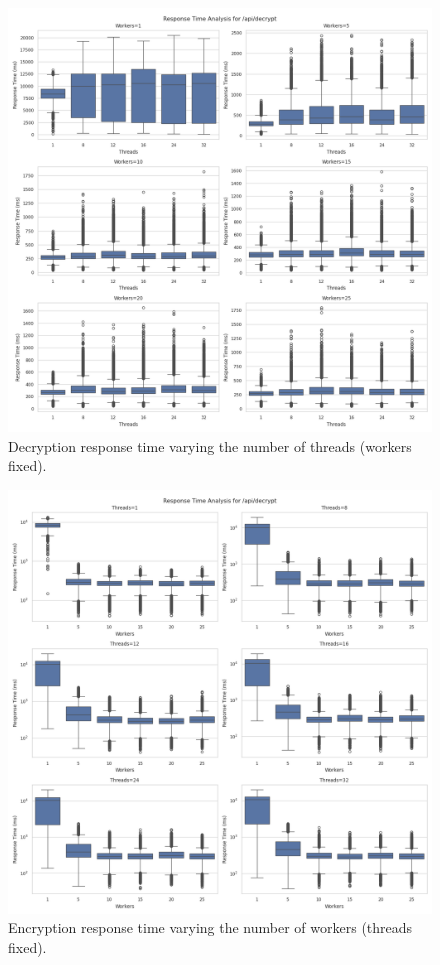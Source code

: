 \documentclass[cic,tc,english]{iiufrgs}
\numberwithin{algorithm}{chapter}
\begin{document}
        \begin{figure}
            \centering
            \includegraphics[width=\textwidth]{images/phase1/api_decrypt/response_time_workers_summary.png}
            \caption{Decryption response time varying the number of threads (workers fixed).}
            \label{fig:decrypt_response_time_workers}
        \end{figure}

        \begin{figure}
            \centering
            \includegraphics[width=\textwidth]{images/phase1/api_decrypt/response_time_threads_summary.png}
            \caption{Encryption response time varying the number of workers (threads fixed).}
            \label{fig:encrypt_response_time_threads}
        \end{figure}
\end{document}
